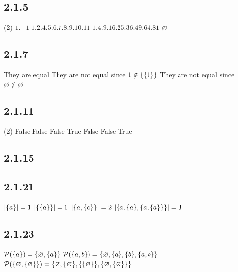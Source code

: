 \documentclass[12pt,titlepage]{extarticle}
\begin{document}
\subsection*{2.1.5}
\begin{tasks}(2)
    \task $\qty{1, -1}$
    \task $\qty{1, 2, 4, 5, 6, 7, 8, 9, 10, 11}$
    \task $\qty{1, 4, 9, 16, 25, 36, 49, 64, 81}$
    \task $\varnothing$
\end{tasks}

\subsection*{2.1.7}
\begin{tasks}
    \task They are equal
    \task They are not equal since $1 \notin \qty{\qty{1}}$
    \task They are not equal since $\varnothing \notin \varnothing$
\end{tasks}

\subsection*{2.1.11}
\begin{tasks}(2)
    \task False
    \task False
    \task False
    \task True
    \task False
    \task False
    \task True
\end{tasks}

\subsection*{2.1.15}
\begin{center}
    
\end{center}

\subsection*{2.1.21}
\begin{tasks}
    \task $\qty|\qty{a}| = 1$
    \task $\qty|\qty{\qty{a}}| = 1$
    \task $\qty|\qty{a, \qty{a}}| = 2$
    \task $\qty|\qty{a, \qty{a}, \qty{a, \qty{a}}}| = 3$
\end{tasks}

\subsection*{2.1.23}
\newcommand\pset{\mathcal{P}}

\begin{tasks}
    \task $\pset(\qty{a}) = \qty{\varnothing, \qty{a}}$
    \task $\pset(\qty{a,b}) = \qty{\varnothing, \qty{a}, \qty{b}, \qty{a,b}}$
    \task $\pset(\qty{\varnothing,\qty{\varnothing}}) = \qty{\varnothing, \qty{\varnothing}, \qty{\qty{\varnothing}}, \qty{\varnothing,\qty{\varnothing}}}$
\end{tasks}
\end{document}
